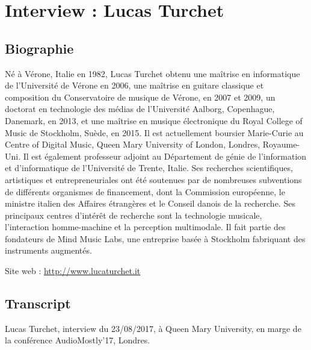 \chapter{Interview : Lucas Turchet}
\label{appendix:turchet}

\section*{Biographie}
\noindent Né à Vérone, Italie en 1982, Lucas Turchet obtenu une maîtrise en informatique de l'Université de Vérone en 2006, une maîtrise en guitare classique et composition du Conservatoire de musique de Vérone, en 2007 et 2009, un doctorat en technologie des médias de l'Université Aalborg, Copenhague, Danemark, en 2013, et une maîtrise en musique électronique du Royal College of Music de Stockholm, Suède, en 2015. Il est actuellement boursier Marie-Curie au Centre of Digital Music, Queen Mary University of London, Londres, Royaume-Uni. Il est également professeur adjoint au Département de génie de l'information et d'informatique de l'Université de Trente, Italie. Ses recherches scientifiques, artistiques et entrepreneuriales ont été soutenues par de nombreuses subventions de différents organismes de financement, dont la Commission européenne, le ministre italien des Affaires étrangères et le Conseil danois de la recherche. Ses principaux centres d'intérêt de recherche sont la technologie musicale, l'interaction homme-machine et la perception multimodale. Il fait partie des fondateurs de Mind Music Labs, une entreprise basée à Stockholm fabriquant des instruments augmentés.

\noindent Site web : \url{http://www.lucaturchet.it}

\section*{Transcript}

\noindent Lucas Turchet, interview du 23/08/2017, à Queen Mary University, en marge de la conférence AudioMostly'17, Londres.

